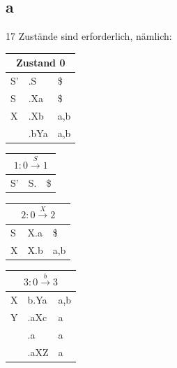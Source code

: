 \documentclass[11pt]{scrartcl}
\begin{document}
	\subsection*{a}
	17 Zustände sind erforderlich, nämlich:
	\begin{table}[!htbp]
	\begin{tabular}{l|l|l}
		\multicolumn{3}{c}{Zustand 0} \\ \hline
		S' & .S & \$ \\ \hline
		S & .Xa & \$ \\ \hline
		X & .Xb & a,b \\
		& .bYa & a,b \\
	\end{tabular}
	\end{table}

	\begin{table}[!htbp]
		\begin{tabular}[t]{l|l|l}
			\multicolumn{3}{c}{$1: 0 \xrightarrow{S} 1$} \\ \hline
			S' & S. & \$ \\ 
		\end{tabular}
		\begin{tabular}[t]{l|l|l}
			\multicolumn{3}{c}{$2: 0 \xrightarrow{X} 2$} \\ \hline
			S & X.a & \$ \\ \hline
			X & X.b & a,b 
		\end{tabular}
		\begin{tabular}[t]{l|l|l}
			\multicolumn{3}{c}{$3: 0 \xrightarrow{b} 3$} \\ \hline
			X & b.Ya & a,b \\ \hline
			Y & .aXc & a \\ 
			& .a & a \\
			& .aXZ & a 
		\end{tabular}
	\end{table}
	
\end{document}

